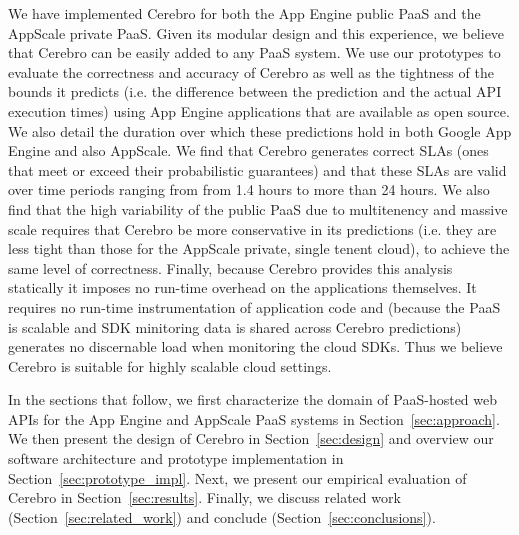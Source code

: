 We have implemented Cerebro for both the App Engine public PaaS and 
the AppScale private PaaS. Given its modular design and this experience, 
we believe that Cerebro can be easily added to any PaaS system.
We use our prototypes to evaluate the correctness and accuracy of Cerebro 
as well as the tightness
of the bounds it predicts (i.e. the difference between the prediction and 
the actual API execution times) using App Engine applications
that are available
as open source.  
We also detail the duration over which 
these predictions hold in both Google App Engine and also AppScale.  
We find that Cerebro generates correct SLAs (ones that meet or exceed their
probabilistic guarantees) and that these SLAs are valid over time periods ranging from
from 1.4 hours to more than 24 hours.  
We also find that the high variability of the public PaaS due to multitenency
and massive scale requires that Cerebro be more conservative in its predictions
(i.e. they are less tight than those for the AppScale private, single tenent cloud), 
to achieve the same level of correctness.  Finally, because Cerebro provides this 
analysis statically it imposes no run-time overhead on the applications
themselves.  It requires no run-time instrumentation of application code and
(because the PaaS is scalable and SDK minitoring data is shared across Cerebro
predictions) generates no discernable load when monitoring
the cloud SDKs.  Thus we believe Cerebro is suitable for highly scalable cloud
settings.


In the sections that follow, we first characterize the domain of 
PaaS-hosted web APIs for the App Engine and AppScale PaaS systems 
in Section~\ref{sec:approach}.   
We then present the design of Cerebro in Section~\ref{sec:design}
and overview our software architecture and prototype implementation
in Section~\ref{sec:prototype_impl}.
Next, we
present our empirical evaluation of Cerebro in 
Section~\ref{sec:results}.
Finally,  we discuss related work (Section~\ref{sec:related_work}) and 
conclude (Section~\ref{sec:conclusions}).
